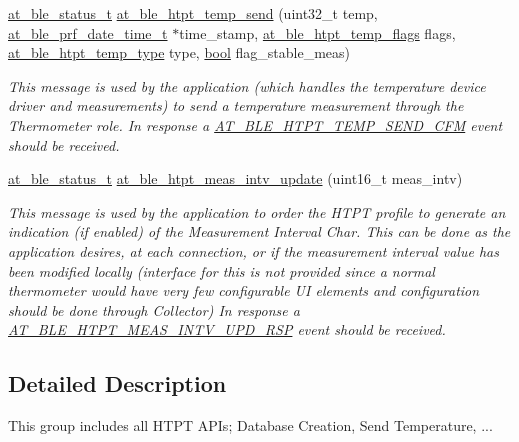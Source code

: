 \begin{DoxyCompactItemize}
\mbox{\hyperlink{group__error__codes__group_ga3b1db9b95feb157b3c188ca27fe76988}{at\+\_\+ble\+\_\+status\+\_\+t}} \mbox{\hyperlink{group__htpt__group_ga4979577ecfab6b25dc76e2a448c65b37}{at\+\_\+ble\+\_\+htpt\+\_\+temp\+\_\+send}} (uint32\+\_\+t temp, \mbox{\hyperlink{structat__ble__prf__date__time__t}{at\+\_\+ble\+\_\+prf\+\_\+date\+\_\+time\+\_\+t}} $\ast$time\+\_\+stamp, \mbox{\hyperlink{at__ble__api_8h_accb2a3740dd79da6ab168adfa69c9548}{at\+\_\+ble\+\_\+htpt\+\_\+temp\+\_\+flags}} flags, \mbox{\hyperlink{at__ble__api_8h_a236445568b928ababcce95965c981348}{at\+\_\+ble\+\_\+htpt\+\_\+temp\+\_\+type}} type, \mbox{\hyperlink{group__group__sam0__utils_ga97a80ca1602ebf2303258971a2c938e2}{bool}} flag\+\_\+stable\+\_\+meas)
\begin{DoxyCompactList}\small\item\em This message is used by the application (which handles the temperature device driver and measurements) to send a temperature measurement through the Thermometer role. In response a \mbox{\hyperlink{at__ble__api_8h_a3324640b95f33169515f89738ed5baeba918f0b91ca899278bb08d41cf98cb005}{A\+T\+\_\+\+B\+L\+E\+\_\+\+H\+T\+P\+T\+\_\+\+T\+E\+M\+P\+\_\+\+S\+E\+N\+D\+\_\+\+C\+FM}} event should be received. \end{DoxyCompactList}\item 
\mbox{\hyperlink{group__error__codes__group_ga3b1db9b95feb157b3c188ca27fe76988}{at\+\_\+ble\+\_\+status\+\_\+t}} \mbox{\hyperlink{group__htpt__group_ga2808738edb6dbd353e562b235a4d10a6}{at\+\_\+ble\+\_\+htpt\+\_\+meas\+\_\+intv\+\_\+update}} (uint16\+\_\+t meas\+\_\+intv)
\begin{DoxyCompactList}\small\item\em This message is used by the application to order the H\+T\+PT profile to generate an indication (if enabled) of the Measurement Interval Char. This can be done as the application desires, at each connection, or if the measurement interval value has been modified locally (interface for this is not provided since a normal thermometer would have very few configurable UI elements and configuration should be done through Collector) In response a \mbox{\hyperlink{at__ble__api_8h_a3324640b95f33169515f89738ed5baeba01220ffe1802556ff06810793137b97a}{A\+T\+\_\+\+B\+L\+E\+\_\+\+H\+T\+P\+T\+\_\+\+M\+E\+A\+S\+\_\+\+I\+N\+T\+V\+\_\+\+U\+P\+D\+\_\+\+R\+SP}} event should be received. \end{DoxyCompactList}\end{DoxyCompactItemize}


\subsection{Detailed Description}
This group includes all H\+T\+PT A\+P\+Is; Database Creation, Send Temperature, ... 



